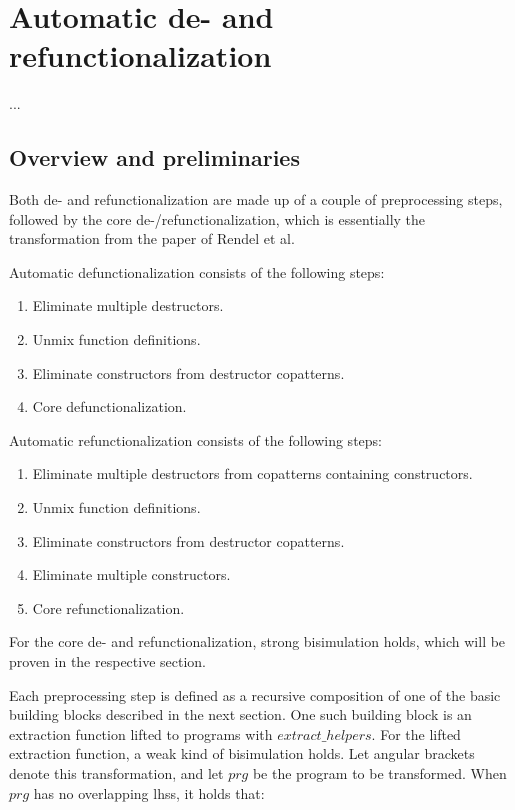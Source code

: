 \chapter{Automatic de- and refunctionalization}

...

\section{Overview and preliminaries}

Both de- and refunctionalization are made up of a couple of preprocessing steps, followed by the core de-/refunctionalization, which is essentially the transformation from the paper of Rendel et al.

Automatic defunctionalization consists of the following steps:
\begin{enumerate}
\item Eliminate multiple destructors.

\item Unmix function definitions.

\item Eliminate constructors from destructor copatterns.

\item Core defunctionalization.

\end{enumerate}

Automatic refunctionalization consists of the following steps:
\begin{enumerate}
\item Eliminate multiple destructors from copatterns containing constructors.

\item Unmix function definitions.

\item Eliminate constructors from destructor copatterns.

\item Eliminate multiple constructors.

\item Core refunctionalization.

\end{enumerate}

For the core de- and refunctionalization, strong bisimulation holds, which will be proven in the respective section.

Each preprocessing step is defined as a recursive composition of one of the basic building blocks described in the next section. One such building block is an extraction function lifted to programs with $extract\_helpers$. For the lifted extraction function, a weak kind of bisimulation holds. Let angular brackets denote this transformation, and let $prg$ be the program to be transformed. When $prg$ has no overlapping lhss, it holds that:

